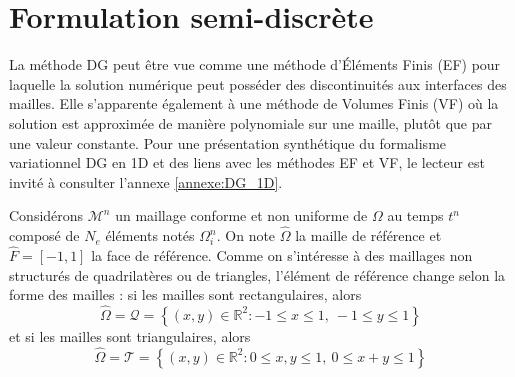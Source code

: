 \documentclass[11pt, a4paper, oneside]{report}
\begin{document}
\section{Formulation semi-discrète}

La méthode DG peut être vue comme une méthode d'Éléments Finis (EF) pour laquelle la solution numérique peut posséder des discontinuités aux interfaces des mailles. Elle s'apparente également à une méthode de Volumes Finis (VF) où la solution est approximée de manière polynomiale sur une maille, plutôt que par une valeur constante. Pour une présentation synthétique du formalisme variationnel DG en 1D et des liens avec les méthodes EF et VF, le lecteur est invité à consulter l'annexe \ref{annexe:DG_1D}.

Considérons $\mathcal{M}^n$ un maillage conforme et non uniforme de $\Omega$ au temps $t^n$ composé de $N_e$ éléments notés $\Omega_i^n$. On note $\widehat{\Omega}$ la maille de référence et $\widehat{F} = [-1, 1]$ la face de référence. Comme on s'intéresse à des maillages non structurés de quadrilatères ou de triangles, l'élément de référence change selon la forme des mailles : si les mailles sont rectangulaires, alors
\begin{equation}
    \widehat{\Omega} = \mathcal{Q} = \left\{ (x, y) \in \mathbb{R}^2 : -1 \leq x \leq 1, ~ -1 \leq y \leq 1 \right\}
\end{equation}
et si les mailles sont triangulaires, alors
\begin{equation}
    \widehat{\Omega} = \mathcal{T} = \left\{ (x, y) \in \mathbb{R}^2 : 0 \leq x, y \leq 1, ~ 0 \leq x + y \leq 1 \right\}
\end{equation}
\end{document}
